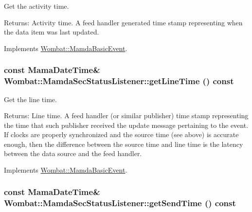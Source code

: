 Get the activity time. 

\begin{Desc}
\item[Returns:]Activity time. A feed handler generated time stamp representing when the data item was last updated. \end{Desc}


Implements \hyperlink{classWombat_1_1MamdaBasicEvent_b3810afc69474ef3b192ee4c9307e714}{Wombat::Mamda\-Basic\-Event}.\hypertarget{classWombat_1_1MamdaSecStatusListener_e879990d8f32b1f28f5ab2fa5e20f441}{
\subsubsection[getLineTime]{\setlength{\rightskip}{0pt plus 5cm}const Mama\-Date\-Time\& Wombat::Mamda\-Sec\-Status\-Listener::get\-Line\-Time () const}}
\label{classWombat_1_1MamdaSecStatusListener_e879990d8f32b1f28f5ab2fa5e20f441}


Get the line time. 

\begin{Desc}
\item[Returns:]Line time. A feed handler (or similar publisher) time stamp representing the time that such publisher received the update message pertaining to the event. If clocks are properly synchronized and the source time (see above) is accurate enough, then the difference between the source time and line time is the latency between the data source and the feed handler. \end{Desc}


Implements \hyperlink{classWombat_1_1MamdaBasicEvent_3fcc26fa1a6446bcec12b11ac74ed26d}{Wombat::Mamda\-Basic\-Event}.\hypertarget{classWombat_1_1MamdaSecStatusListener_74b08a2717cecd05952794bcc3e9165a}{
\subsubsection[getSendTime]{\setlength{\rightskip}{0pt plus 5cm}const Mama\-Date\-Time\& Wombat::Mamda\-Sec\-Status\-Listener::get\-Send\-Time () const}}
\label{classWombat_1_1MamdaSecStatusListener_74b08a2717cecd05952794bcc3e9165a}


